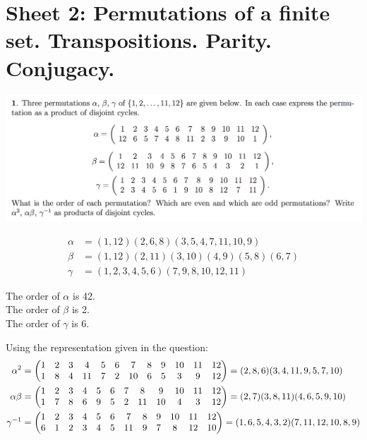 \documentclass[12pt]{article}
\begin{document}
\newpage

\section{Sheet 2: Permutations of a finite set. Transpositions. Parity. Conjugacy.}

\begin{mdframed}
\includegraphics[width=400pt]{img/oxford-prelims-M1-groups-2-1.png}
\end{mdframed}

\begin{align*}
  \alpha &= (1,12)(2,6,8)(3,5,4,7,11,10,9)\\
  \beta  &= (1,12)(2,11)(3,10)(4,9)(5,8)(6,7)\\
  \gamma &= (1,2,3,4,5,6)(7,9,8,10,12,11)
\end{align*}

The order of $\alpha$ is 42.\\
The order of $\beta$ is 2.\\
The order of $\gamma$ is 6.\\


Using the representation given in the question:
\begin{align*}
  \setcounter{MaxMatrixCols}{12}
  \alpha^2 &=
  \begin{pmatrix}
    1 & 2 & 3 & 4  & 5 & 6 & 7  & 8 & 9 & 10 & 11 & 12\\
    1 & 8 & 4 & 11 & 7 & 2 & 10 & 6 & 5 & 3  & 9  & 12
  \end{pmatrix}
                                                    = (2,8,6)(3,4,11,9,5,7,10)\\
  \alpha\beta &=
  \begin{pmatrix}
    1 & 2 & 3 & 4 & 5 & 6 & 7 & 8  & 9  & 10 & 11 & 12\\
    1 & 7 & 8 & 6 & 9 & 5 & 2 & 11 & 10 & 4  & 3  & 12
  \end{pmatrix}
                                                    = (2,7)(3,8,11)(4,6,5,9,10)\\
  \gamma^\1   &=
  \begin{pmatrix}
    1 & 2 & 3 & 4 & 5 & 6 & 7  & 8 & 9 & 10 & 11 & 12\\
    6 & 1 & 2 & 3 & 4 & 5 & 11 & 9 & 7 & 8  & 12 & 10
  \end{pmatrix}
                                                   = (1,6,5,4,3,2)(7,11,12,10,8,9)
\end{align*}
\end{document}
